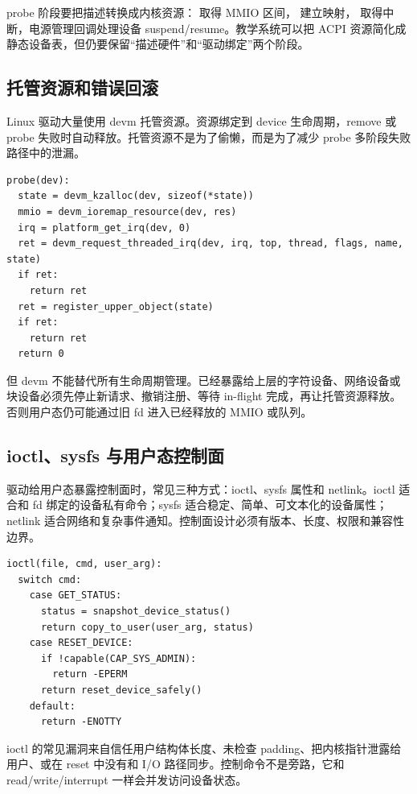probe 阶段要把描述转换成内核资源： 取得 MMIO 区间， 建立映射， 取得中断，电源管理回调处理设备 suspend/resume。教学系统可以把 ACPI 资源简化成静态设备表，但仍要保留“描述硬件”和“驱动绑定”两个阶段。

\subsection{托管资源和错误回滚}

Linux 驱动大量使用 devm 托管资源。资源绑定到 device 生命周期，remove 或 probe 失败时自动释放。托管资源不是为了偷懒，而是为了减少 probe 多阶段失败路径中的泄漏。

\begin{lstlisting}
probe(dev):
  state = devm_kzalloc(dev, sizeof(*state))
  mmio = devm_ioremap_resource(dev, res)
  irq = platform_get_irq(dev, 0)
  ret = devm_request_threaded_irq(dev, irq, top, thread, flags, name, state)
  if ret:
    return ret
  ret = register_upper_object(state)
  if ret:
    return ret
  return 0
\end{lstlisting}

但 devm 不能替代所有生命周期管理。已经暴露给上层的字符设备、网络设备或块设备必须先停止新请求、撤销注册、等待 in-flight 完成，再让托管资源释放。否则用户态仍可能通过旧 fd 进入已经释放的 MMIO 或队列。

\subsection{ioctl、sysfs 与用户态控制面}

驱动给用户态暴露控制面时，常见三种方式：ioctl、sysfs 属性和 netlink。ioctl 适合和 fd 绑定的设备私有命令；sysfs 适合稳定、简单、可文本化的设备属性；netlink 适合网络和复杂事件通知。控制面设计必须有版本、长度、权限和兼容性边界。

\begin{lstlisting}
ioctl(file, cmd, user_arg):
  switch cmd:
    case GET_STATUS:
      status = snapshot_device_status()
      return copy_to_user(user_arg, status)
    case RESET_DEVICE:
      if !capable(CAP_SYS_ADMIN):
        return -EPERM
      return reset_device_safely()
    default:
      return -ENOTTY
\end{lstlisting}

ioctl 的常见漏洞来自信任用户结构体长度、未检查 padding、把内核指针泄露给用户、或在 reset 中没有和 I/O 路径同步。控制命令不是旁路，它和 read/write/interrupt 一样会并发访问设备状态。

